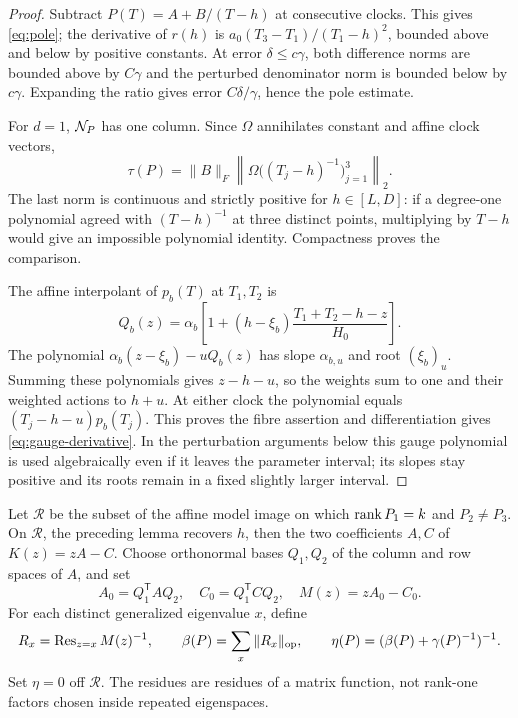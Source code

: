 \begin{proof}
Subtract $P(T)=A+B/(T-h)$ at consecutive clocks. This gives
\eqref{eq:pole}; the derivative of $r(h)$ is
$a_0(T_3-T_1)/(T_1-h)^2$, bounded above and below by positive
constants. At error $\delta\le c\gamma$, both difference norms are
bounded above by $C\gamma$ and the perturbed denominator norm is
bounded below by $c\gamma$. Expanding the ratio gives error
$C\delta/\gamma$, hence the pole estimate.

For $d=1$, $\mathcal N_P$ has one column. Since $\Omega$ annihilates
constant and affine clock vectors,
\[
 \tau(P)=\|B\|_F\left\|\Omega\big((T_j-h)^{-1}\big)_{j=1}^3\right\|_2.
\]
The last norm is continuous and strictly positive for $h\in[L,D]$:
if a degree-one polynomial agreed with $(T-h)^{-1}$ at three distinct
points, multiplying by $T-h$ would give an impossible polynomial
identity. Compactness proves the comparison.

The affine interpolant of $p_b(T)$ at $T_1,T_2$ is
\[
 Q_b(z)=\alpha_b\left[1+(h-\xi_b)
                              \frac{T_1+T_2-h-z}{H_0}\right].
\]
The polynomial $\alpha_b(z-\xi_b)-uQ_b(z)$ has slope
$\alpha_{b,u}$ and root $(\xi_b)_u$. Summing these polynomials gives
$z-h-u$, so the weights sum to one and their weighted actions to
$h+u$. At either clock the polynomial equals
$(T_j-h-u)p_b(T_j)$. This proves the fibre assertion and differentiation
gives \eqref{eq:gauge-derivative}. In the perturbation arguments below
this gauge polynomial is used algebraically even if it leaves the
parameter interval; its slopes stay positive and its roots remain in
a fixed slightly larger interval.
\end{proof}

Let $\mathcal R$ be the subset of the affine model image on which
$\operatorname{rank} P_1=k$ and $P_2\ne P_3$. On $\mathcal R$, the preceding lemma
recovers $h$, then the two coefficients $A,C$ of $K(z)=zA-C$.
Choose orthonormal bases $Q_1,Q_2$ of the column and row spaces of $A$,
and set
\begin{equation}\label{eq:reduced}
 A_0=Q_1^{\mathsf T}AQ_2,\quad C_0=Q_1^{\mathsf T}CQ_2,
 \quad M(z)=zA_0-C_0.
\end{equation}
For each distinct generalized eigenvalue $x$, define
\begin{equation}\label{eq:eta}
 R_x=\operatorname{Res}_{z=x}M(z)^{-1},\qquad
 \beta(P)=\sum_x\|R_x\|_{\mathrm{op}},\qquad
 \eta(P)=(\beta(P)+\gamma(P)^{-1})^{-1}.
\end{equation}
Set $\eta=0$ off $\mathcal R$. The residues are residues of a matrix
function, not rank-one factors chosen inside repeated eigenspaces.

